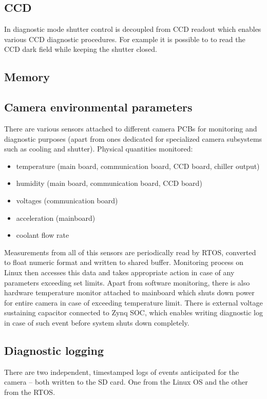 \subsection{CCD}
In diagnostic mode shutter control is decoupled from CCD readout which enables various CCD diagnostic procedures. For example it is possible to to read the CCD dark field while keeping the shutter closed.

\subsection{Memory}
 
\subsection{Camera environmental parameters}
There are various sensors attached to different camera PCBs for monitoring and diagnostic purposes (apart from ones dedicated for specialized camera subsystems such as cooling and shutter). Physical quantities monitored:
\begin{itemize}
\item temperature (main board, communication board, CCD board, chiller output)
\item humidity (main board, communication board, CCD board)
\item voltages (communication board)
\item acceleration (mainboard)
\item coolant flow rate
\end{itemize}

Measurements from all of this sensors are periodically read by RTOS, converted to float numeric format and written to shared buffer. Monitoring process on Linux then accesses this data and takes appropriate action in case of any parameters exceeding set limits.
Apart from software monitoring, there is also hardware temperature monitor attached to mainboard which shuts down power for entire camera in case of exceeding temperature limit. There is external voltage sustaining capacitor connected to Zynq SOC, which enables writing diagnostic log in case of such event before system shuts down completely.

\subsection{Diagnostic logging}
There are two independent, timestamped logs of events anticipated for the camera – both written to the SD card. One from the Linux OS and the other from the RTOS.
 
